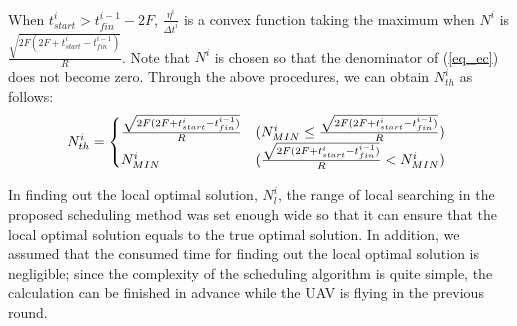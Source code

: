 \documentclass{ieeeaccess}
\begin{document}
%
When $t_{start}^i >{t_{fin}^{i-1}-2F}$, $\frac{\eta^{i}}{{\Delta{t}}^i}$ is a convex function taking the maximum when $N^i$ is $\frac{\sqrt{2F(2F+t_{start}^i-t_{fin}^{i-1})}}{R}$.
%
Note that $N^i$ is chosen so that the denominator of (\ref{eq_ec}) does not become zero.
%
Through the above procedures, we can obtain $N_{th}^i$ as follows:
%
\begin{align}
 \hspace{-1.5mm} N_{th}^i= \begin{cases}
    \frac{\sqrt{2F(2F+t_{start}^i-t_{fin}^{i-1})}}{R} & ({N_{MIN}^i}\leq{\frac{\sqrt{2F(2F+t_{start}^i-t_{fin}^{i-1})}}{R}}) \\
    N_{MIN}^i& (\frac{\sqrt{2F(2F+t_{start}^i-t_{fin}^{i-1})}}{R}<{N_{MIN}^i})
  \end{cases}
\end{align}

In finding out the local optimal solution, $N_{l}^i$, the range of local searching in the proposed scheduling method was set enough wide so that it can ensure that the local optimal solution equals to the true optimal solution.
%
In addition, we assumed that the consumed time for finding out the local optimal solution is negligible; since the complexity of the scheduling algorithm is quite simple, the calculation can be finished in advance while the UAV is flying in the previous round.




\ifCLASSOPTIONcaptionsoff
  \newpage
\fi


\end{document}
